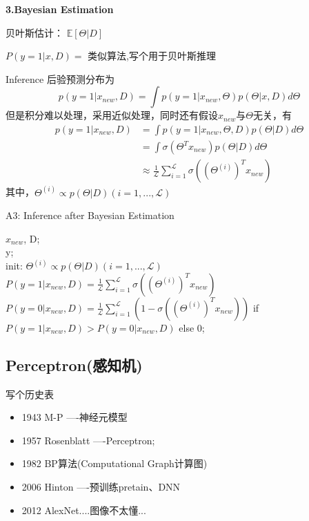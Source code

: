 \documentclass[UTF8]{ctexart}
\begin{document}
\textbf{3.Bayesian Estimation}

贝叶斯估计：
$\mathbb{E}[\Theta | D]$

$P(y=1|x, D) = $
类似算法,写个用于贝叶斯推理

Inference
后验预测分布为
\begin{equation*}
    p(y=1|x_{new}, D) = \int p(y=1 | x_{new}, \Theta)p(\Theta|x,D)d\Theta
\end{equation*}
但是积分难以处理，采用近似处理，同时还有假设$x_{new}$与$\Theta$无关，有
\begin{equation*}
    \begin{aligned}
        p(y=1|x_{new}, D) &= \int p(y=1 | x_{new}, \Theta, D)p(\Theta|D)d\Theta \\
        &= \int \sigma(\Theta^Tx_{new})p(\Theta |D)d\Theta \\
        &\approx \frac{1}{\mathcal{L}}\sum_{i=1}^{\mathcal{L}} \sigma((\Theta^{(i)})^Tx_{new} )
    \end{aligned}
\end{equation*}
其中，${\Theta}^{(i)} \propto p(\Theta | D) (i=1,..., \mathcal{L})$

\begin{algorithm}[htb]
    \caption{A3: Inference after Bayesian Estimation}
    \label{alg:A3}
    \begin{algorithmic}[1]
    \REQUIRE
    $x_{new}$, D; \\
    \ENSURE 
    y; \\
    \STATE init: ${\Theta}^{(i)} \propto p(\Theta | D) (i=1,..., \mathcal{L})$
    \STATE $P(y=1|x_{new},D)=\frac{1}{\mathcal{L}} \sum_{i=1}^{\mathcal{L}} \sigma((\Theta^{(i)})^T x_{new})$
    \STATE $P(y=0|x_{new},D)=\frac{1}{\mathcal{L}}\sum_{i=1}^{\mathcal{L}} (1-\sigma((\Theta^{(i)})^Tx_{new}) )$
     if $P(y=1|x_{new},D) > P(y=0|x_{new},D)$ else 0;
    \end{algorithmic}
\end{algorithm}


\subsection{Perceptron(感知机)}

写个历史表
\begin{itemize}
    \item 1943 M-P ----神经元模型
    \item 1957 Rosenblatt ----Perceptron;
    \item 1982 BP算法(Computational Graph计算图)
    \item 2006 Hinton ----预训练pretain、DNN
    \item 2012 AlexNet....图像不太懂...
\end{itemize}
\end{document}
